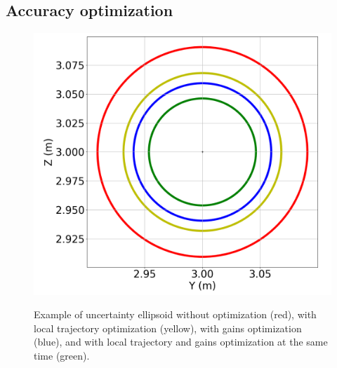 \subsection{Accuracy optimization} \label{results:AccEval}

\begin{figure} [t]
    \centering
    {\includegraphics[width=0.5\linewidth]{figures/robust_accurate/accuracy_opti.png} }%
    \caption{Example of uncertainty ellipsoid without optimization (red), with local trajectory optimization (yellow), with gains optimization (blue), and with local trajectory and gains optimization at the same time (green).}%
    \label{fig: Acc opti}%
\end{figure}

